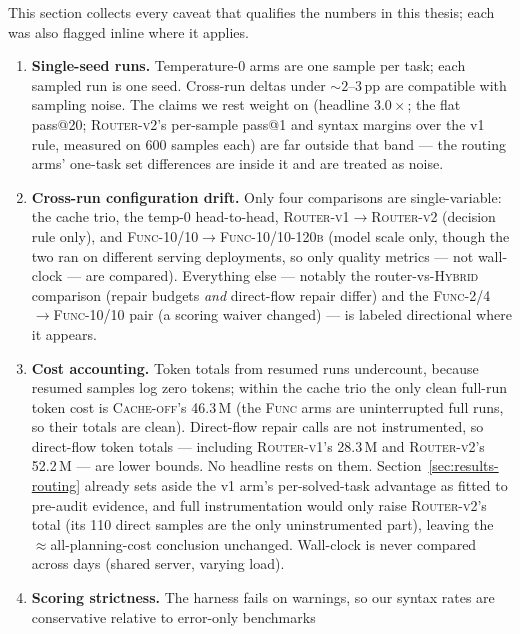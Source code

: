 This section collects every caveat that qualifies the numbers in
this thesis; each was also flagged inline where it applies.

\begin{enumerate}
  \item \textbf{Single-seed runs.} Temperature-0 arms are one sample per
    task; each sampled run is one seed. Cross-run deltas under
    ${\sim}2$--3\,pp are compatible with sampling noise. The claims we
    rest weight on (headline $3.0\times$; the flat pass@20;
    \textsc{Router-v2}'s per-sample pass@1 and syntax margins over the
    v1 rule, measured on 600 samples each) are far outside that band ---
    the routing arms' one-task set differences are inside it and are
    treated as noise.
  \item \textbf{Cross-run configuration drift.} Only four comparisons
    are single-variable: the cache trio, the temp-0 head-to-head,
    \textsc{Router-v1}$\to$\textsc{Router-v2} (decision rule only), and
    \textsc{Func-10/10}$\to$\textsc{Func-10/10-120b} (model scale
    only, though the two ran on different serving deployments, so only
    quality metrics --- not wall-clock --- are compared).
    Everything else ---
    notably the router-vs-\textsc{Hybrid} comparison (repair budgets
    \emph{and} direct-flow repair differ) and the \textsc{Func-2/4}
    $\to$\textsc{Func-10/10} pair (a scoring waiver changed) --- is
    labeled directional where it appears.
  \item \textbf{Cost accounting.} Token totals from resumed runs
    undercount, because resumed samples log zero tokens; within the
    cache trio the only clean full-run token cost is
    \textsc{Cache-off}'s 46.3\,M (the \textsc{Func} arms are
    uninterrupted full runs, so their totals are clean). Direct-flow
    repair calls are not instrumented, so direct-flow token totals ---
    including \textsc{Router-v1}'s 28.3\,M and \textsc{Router-v2}'s
    52.2\,M --- are lower bounds. No headline rests on them.
    Section~\ref{sec:results-routing} already sets aside the v1 arm's
    per-solved-task advantage as fitted to pre-audit evidence, and full
    instrumentation would only raise \textsc{Router-v2}'s total
    (its 110 direct samples are the only uninstrumented part), leaving
    the $\approx$all-planning-cost conclusion unchanged.
    Wall-clock is never compared across days (shared server, varying
    load).
  \item \textbf{Scoring strictness.} The harness fails on warnings, so
    our syntax rates are conservative relative to error-only benchmarks

\end{enumerate}
